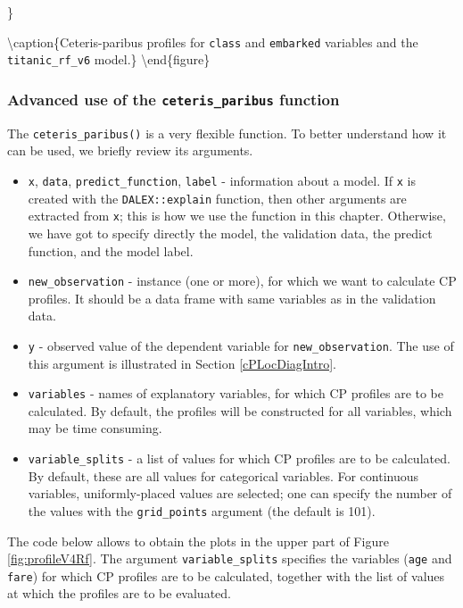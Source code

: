 \documentclass[12pt,]{krantz}
\providecommand{\tightlist}{%
  \setlength{\itemsep}{0pt}\setlength{\parskip}{0pt}}
\begin{document}
\}

\textbackslash{}caption\{Ceteris-paribus profiles for \texttt{class} and \texttt{embarked} variables and the \texttt{titanic\_rf\_v6} model.\}\label{fig:titanicCeterisProfile01B}
\textbackslash{}end\{figure\}

\hypertarget{advanced-use-of-the-ceteris_paribus-function}{%
\subsubsection{\texorpdfstring{Advanced use of the \texttt{ceteris\_paribus} function}{Advanced use of the ceteris\_paribus function}}\label{advanced-use-of-the-ceteris_paribus-function}}

The \texttt{ceteris\_paribus()} is a very flexible function. To better understand how it can be used, we briefly review its arguments.

\begin{itemize}
\tightlist
\item
  \texttt{x}, \texttt{data}, \texttt{predict\_function}, \texttt{label} - information about a model. If \texttt{x} is created with the \texttt{DALEX::explain} function, then other arguments are extracted from \texttt{x}; this is how we use the function in this chapter. Otherwise, we have got to specify directly the model, the validation data, the predict function, and the model label.
\item
  \texttt{new\_observation} - instance (one or more), for which we want to calculate CP profiles. It should be a data frame with same variables as in the validation data.
\item
  \texttt{y} - observed value of the dependent variable for \texttt{new\_observation}. The use of this argument is illustrated in Section \ref{cPLocDiagIntro}.
\item
  \texttt{variables} - names of explanatory variables, for which CP profiles are to be calculated. By default, the profiles will be constructed for all variables, which may be time consuming.
\item
  \texttt{variable\_splits} - a list of values for which CP profiles are to be calculated. By default, these are all values for categorical variables. For continuous variables, uniformly-placed values are selected; one can specify the number of the values with the \texttt{grid\_points} argument (the default is 101).
\end{itemize}

The code below allows to obtain the plots in the upper part of Figure \ref{fig:profileV4Rf}. The argument \texttt{variable\_splits} specifies the variables (\texttt{age} and \texttt{fare}) for which CP profiles are to be calculated, together with the list of values at which the profiles are to be evaluated.
\end{document}
